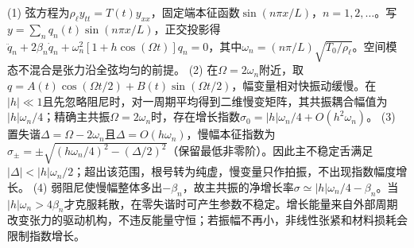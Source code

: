 (1) 弦方程为\(\rho_\ell y_{tt}=T(t)y_{xx}\)，固定端本征函数\(\sin(n\pi x/L)\)，\(n=1,2,\ldots\)。写\(y=\sum_nq_n(t)\sin(n\pi x/L)\)，正交投影得\(\ddot q_n+2\beta_n\dot q_n+\omega_n^2[1+h\cos(\Omega t)]q_n=0\)，其中\(\omega_n=(n\pi/L)\sqrt{T_0/\rho_\ell}\)。空间模态不混合是张力沿全弦均匀的前提。
(2) 在\(\Omega=2\omega_n\)附近，取\(q=A(t)\cos(\Omega t/2)+B(t)\sin(\Omega t/2)\)，幅变量相对快振动缓慢。在\(|h|\ll1\)且先忽略阻尼时，对一周期平均得到二维慢变矩阵，其共振耦合幅值为\(|h|\omega_n/4\)；精确主共振\(\Omega=2\omega_n\)时，存在增长指数\(\sigma_0=|h|\omega_n/4+O(h^2\omega_n)\)。
(3) 置失谐\(\Delta=\Omega-2\omega_n\)且\(\Delta=O(h\omega_n)\)，慢幅本征指数为\(\sigma_\pm=\pm\sqrt{(h\omega_n/4)^2-(\Delta/2)^2}\)（保留最低非零阶）。因此主不稳定舌满足\(|\Delta|<|h|\omega_n/2\)；超出该范围，根号转为纯虚，慢变量只作拍振，不出现指数幅度增长。
(4) 弱阻尼使慢幅整体多出\(-\beta_n\)，故主共振的净增长率\(\sigma\simeq|h|\omega_n/4-\beta_n\)。当\(|h|\omega_n>4\beta_n\)才克服耗散，在零失谐时可产生参数不稳定。增长能量来自外部周期改变张力的驱动机构，不违反能量守恒；若振幅不再小，非线性张紧和材料损耗会限制指数增长。
